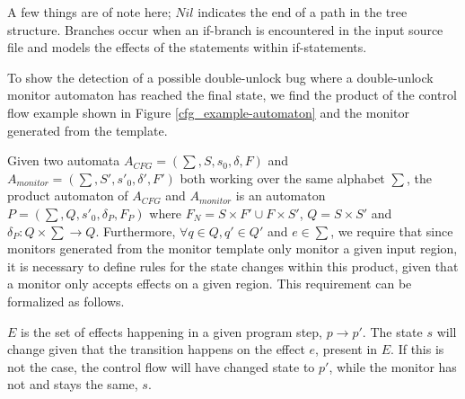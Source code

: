 \noindent A few things are of note here; $Nil$ indicates the end of a path in the tree structure. Branches occur when an if-branch is encountered in the input source file and models the effects of the statements within if-statements.

\newpar To show the detection of a possible double-unlock bug where a double-unlock monitor automaton has reached the final state, we find the product of the control flow example shown in Figure \ref{cfg_example-automaton} and the monitor generated from the template. 

\newpar Given two automata $A_{CFG} = (\sum, S, s_0, \delta, F)$ and $A_{monitor} = (\sum, S', s'_0, \delta', F')$ both working over the same alphabet $\sum$, the product automaton of $A_{CFG}$ and $A_{monitor}$ is an automaton $P = (\sum, Q, s'_0, \delta_P, F_P)$ where $F_N = S \times F' \cup F \times S'$, $Q = S \times S'$ and $\delta_P : Q \times \sum \rightarrow Q$. Furthermore, $\forall q \in Q , q' \in Q'$ and $e \in \sum$, we require that since monitors generated from the monitor template only monitor a given input region, it is necessary to define rules for the state changes within this product, given that a monitor only accepts effects on a given region. This requirement can be formalized as follows.

\begin{center}
    \begin{prooftree}
    \end{prooftree}
    \hspace{2cm}
    \begin{prooftree}
    \end{prooftree}
\end{center}
    
\newpar $E$ is the set of effects happening in a given program step, $p \rightarrow p'$. The state $s$ will change given that the transition happens on the effect $e$, present in $E$. If this is not the case, the control flow will have changed state to $p'$, while the monitor has not and stays the same, $s$. 

